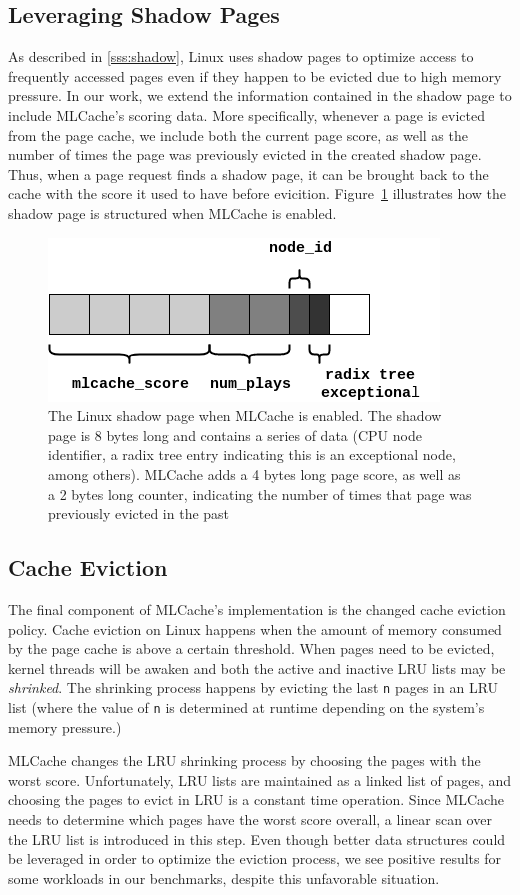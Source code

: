 \subsection{Leveraging Shadow Pages}

As described in \ref{sss:shadow}, Linux uses shadow pages to optimize access to frequently accessed
pages even if they happen to be evicted due to high memory pressure. In our work, we extend the information
contained in the shadow page to include MLCache's scoring data. More specifically, whenever a page
is evicted from the page cache, we include both the current page score, as well as the number of times
the page was previously evicted in the created shadow page. Thus, when a page request finds a shadow
page, it can be brought back to the cache with the score it used to have before evicition. Figure~\ref{fig:shadow}
illustrates how the shadow page is structured when MLCache is enabled.

\begin{figure}[h]
  \includegraphics[scale=0.4]{img/ShadowPage.png}
  \caption{The Linux shadow page when MLCache is enabled. The shadow page is 8 bytes long
  and contains a series of data (CPU node identifier, a radix tree entry indicating this is
  an exceptional node, among others). MLCache adds a 4 bytes long page score, as well as a
  2 bytes long counter, indicating the number of times that page was previously evicted in the past}
  \label{fig:shadow}
\end{figure}

\subsection{Cache Eviction}

The final component of MLCache's implementation is the changed cache eviction policy. Cache eviction
on Linux happens when the amount of memory consumed by the page cache is above a certain threshold.
When pages need to be evicted, kernel threads will be awaken and both the active and inactive
LRU lists may be \emph{shrinked}. The shrinking process happens by evicting the last \texttt{n}
pages in an LRU list (where the value of \texttt{n} is determined at runtime depending on the
system's memory pressure.)

MLCache changes the LRU shrinking process by choosing the pages with the worst score. Unfortunately,
LRU lists are maintained as a linked list of pages, and choosing the pages to evict in LRU is a
constant time operation. Since MLCache needs to determine which pages have the worst score overall,
a linear scan over the LRU list is introduced in this step. Even though better data structures could
be leveraged in order to optimize the eviction process, we see positive results for some workloads
in our benchmarks, despite this unfavorable situation.
